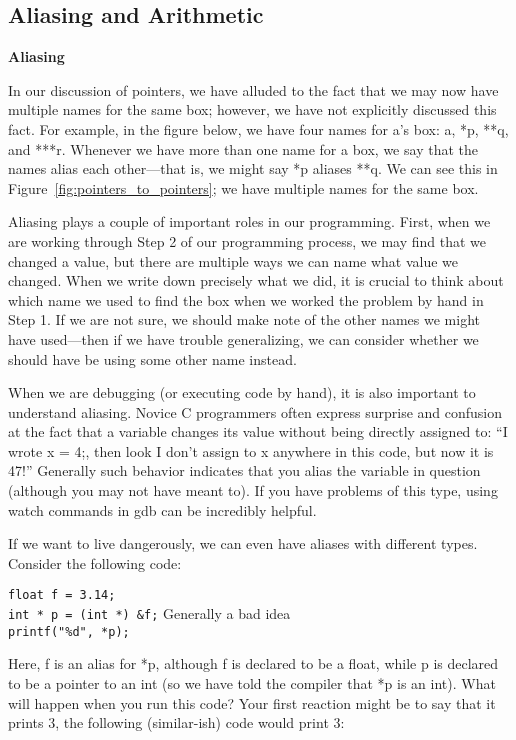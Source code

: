\documentclass[11pt, a4paper]{article}
\begin{document}
\subsection{Aliasing and Arithmetic}%
\label{ssub:aliasing_and_arithmetic}

\textbf{Aliasing}

In our discussion of pointers, we have alluded to the fact that we may now have multiple names for the same box; however, we have not explicitly discussed this fact. For example, in the figure below, we have four names for a’s box: a, *p, **q, and ***r. Whenever we have more than one name for a box, we say that the names alias each other—that is, we might say *p aliases **q. We can see this in Figure~\ref{fig:pointers_to_pointers}; we have multiple names for the same box. 


Aliasing plays a couple of important roles in our programming. First, when we are working through Step 2 of our programming process, we may find that we changed a value, but there are multiple ways we can name what value we changed. When we write down precisely what we did, it is crucial to think about which name we used to find the box when we worked the problem by hand in Step 1. If we are not sure, we should make note of the other names we might have used—then if we have trouble generalizing, we can consider whether we should have be using some other name instead.

When we are debugging (or executing code by hand), it is also important to understand aliasing. Novice C programmers often express surprise and confusion at the fact that a variable changes its value without being directly assigned to: “I wrote x = 4;, then look I don’t assign to x anywhere in this code, but now it is 47!” Generally such behavior indicates that you alias the variable in question (although you may not have meant to). If you have problems of this type, using watch commands in gdb can be incredibly helpful.

If we want to live dangerously, we can even have aliases with different types. Consider the following code:


\texttt{float f = 3.14;} \\
\texttt{int * p = (int *) \&f;} Generally a bad idea \\
\texttt{printf("\%d", *p);} 


Here, f is an alias for *p, although f is declared to be a float, while p is declared to be a pointer to an int (so we have told the compiler that *p is an int). What will happen when you run this code? Your first reaction might be to say that it prints 3, the following (similar-ish) code would print 3:
\end{document}
